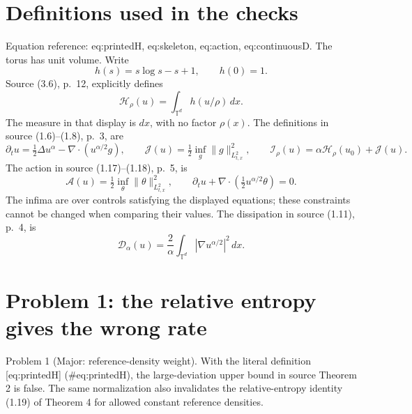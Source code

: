 \documentclass[10pt]{article}
\begin{document}
\section*{Definitions used in the checks}
Equation reference: eq:printedH, eq:skeleton, eq:action, eq:continuousD. The torus has unit volume. Write \[h(s)=s\log s-s+1,\qquad h(0)=1.\] Source (3.6), p. 12, explicitly defines \[
\mathcal H_\rho(u)=\int_{\mathbb T^d}h(u/\rho)\,dx.\] The measure in that display is \(dx\), with no factor \(\rho(x)\). The definitions in source (1.6)–(1.8), p. 3, are \[
\partial_tu=\tfrac12\Delta u^\alpha-\nabla\cdot(u^{\alpha/2}g),
\qquad
\mathcal J(u)=\tfrac12\inf_g\|g\|_{L^2_{t,x}}^2,
\qquad
\mathcal I_\rho(u)=\alpha\mathcal H_\rho(u_0)+\mathcal J(u).\] The action in source (1.17)–(1.18), p. 5, is \[
\mathcal A(u)=\tfrac12\inf_\theta\|\theta\|_{L^2_{t,x}}^2,
\qquad
\partial_tu+\nabla\cdot(\tfrac12u^{\alpha/2}\theta)=0.\] The infima are over controls satisfying the displayed equations; these constraints cannot be changed when comparing their values. The dissipation in source (1.11), p. 4, is \[
\mathcal D_\alpha(u)=\frac2\alpha\int_{\mathbb T^d}|\nabla u^{\alpha/2}|^2\,dx.\]\par
\section*{Problem 1: the relative entropy gives the wrong rate}
Problem 1 (Major: reference-density weight).  With the literal definition [eq:printedH] (\#eq:printedH), the large-deviation upper bound in source Theorem 2 is false. The same normalization also invalidates the relative-entropy identity (1.19) of Theorem 4 for allowed constant reference densities.\par
\end{document}
